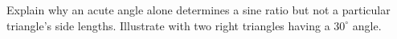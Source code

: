 Explain why an acute angle alone determines a sine ratio but not a particular triangle's side lengths. Illustrate with two right triangles having a $30^\circ$ angle.

